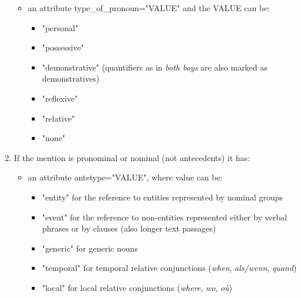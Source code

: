 \documentclass[a4paper]{article}
\begin{document}
\begin{enumerate}
\begin{itemize}
%  
 
 \item an attribute type\_of\_pronoun="VALUE" and the VALUE can be:
 \begin{itemize}
 \item "personal"
 \item "possessive"
 \item "demonstrative" (quantifiers as in \textsl{both boys} are also marked as demonstratives)
 \item "reflexive"
 \item "relative"
 \item "none"
 \end{itemize}

\end{itemize}

\item If the mention is pronominal or nominal (not antecedents) it has:
\begin{itemize}
\item an attribute antetype="VALUE", where value can be:
\begin{itemize}
\item "entity" for the reference to entities represented by nominal groups
\item "event" for the reference to non-entities represented either by verbal phrases or by clauses (also longer text passages)
\item "generic" for generic nouns
\item "temporal" for temporal relative conjunctions (\textit{when}, \textit{als/wenn}, \textit{quand})
\item "local" for local relative conjunctions (\textit{where}, \textit{wo}, \textit{où})
\end{itemize}
 

\end{itemize}
\end{enumerate}
\end{document}
